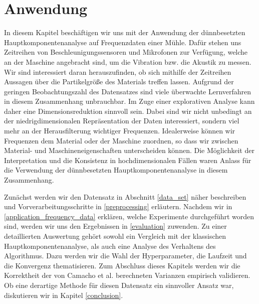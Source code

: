 \chapter{Anwendung}

\label{application}

In diesem Kapitel beschäftigen wir uns mit der Anwendung der dünnbesetzten Hauptkomponentenanalyse auf Frequenzdaten einer Mühle. Dafür stehen uns Zeitreihen von Beschleunigungssensoren und Mikrofonen zur Verfügung, welche an der Maschine angebracht sind, um die Vibration bzw. die Akustik zu messen. Wir sind interessiert daran herauszufinden, ob sich mithilfe der Zeitreihen Aussagen über die Partikelgröße des Materials treffen lassen. Aufgrund der geringen Beobachtungszahl des Datensatzes sind viele überwachte Lernverfahren in diesem Zusammenhang unbrauchbar. Im Zuge einer explorativen Analyse kann daher eine Dimensionsreduktion sinnvoll sein. Dabei sind wir nicht unbedingt an der niedrigdimensionalen Repräsentation der Daten interessiert, sondern viel mehr an der Herausfilterung wichtiger Frequenzen. Idealerweise können wir Frequenzen dem Material oder der Maschine zuordnen, so dass wir zwischen Material- und Maschineneigenschaften unterscheiden können. Die Möglichkeit der Interpretation und die Konsistenz in hochdimensionalen Fällen waren Anlass für die Verwendung der dünnbesetzten Hauptkomponentenanalyse in diesem Zusammenhang. 

Zunächst werden wir den Datensatz in Abschnitt \ref{data_set} näher beschreiben und Vorverarbeitungsschritte in \ref{preprocessing} erläutern. Nachdem wir in \ref{application_frequency_data} erklären, welche Experimente durchgeführt worden sind, werden wir uns den Ergebnissen in \ref{evaluation} zuwenden. Zu einer detaillierten Auswertung gehört sowohl ein Vergleich mit der klassischen Hauptkomponentenanalyse, als auch eine Analyse des Verhaltens des Algorithmus. Dazu werden wir die Wahl der Hyperparameter, die Laufzeit und die Konvergenz thematisieren. Zum Abschluss dieses Kapitels werden wir die Korrektheit der von Camacho et al. \cite{camacho} berechneten Varianzen empirisch validieren. Ob eine derartige Methode für diesen Datensatz ein sinnvoller Ansatz war, diskutieren wir in Kapitel \ref{conclusion}.




